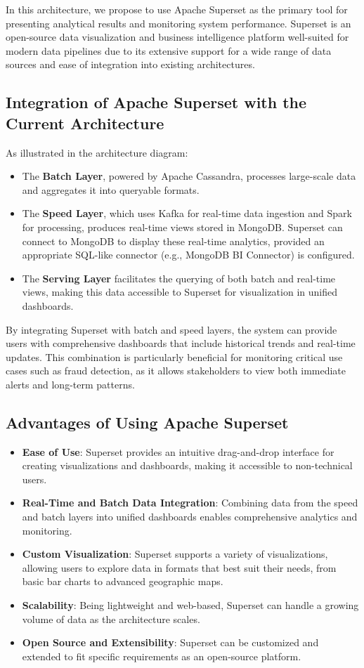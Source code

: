 \documentclass[12pt,a4paper, hidelinks]{article}
\begin{document}
In this architecture, we propose to use Apache Superset as the primary tool for presenting analytical results and monitoring system performance. Superset is an open-source data visualization and business intelligence platform well-suited for modern data pipelines due to its extensive support for a wide range of data sources and ease of integration into existing architectures.

\subsection{Integration of Apache Superset with the Current Architecture}
As illustrated in the architecture diagram:
\begin{itemize}
    \item The \textbf{Batch Layer}, powered by Apache Cassandra, processes large-scale data and aggregates it into queryable formats.
    \item The \textbf{Speed Layer}, which uses Kafka for real-time data ingestion and Spark for processing, produces real-time views stored in MongoDB. Superset can connect to MongoDB to display these real-time analytics, provided an appropriate SQL-like connector (e.g., MongoDB BI Connector) is configured.
    \item The \textbf{Serving Layer} facilitates the querying of both batch and real-time views, making this data accessible to Superset for visualization in unified dashboards.
\end{itemize}

By integrating Superset with batch and speed layers, the system can provide users with comprehensive dashboards that include historical trends and real-time updates. This combination is particularly beneficial for monitoring critical use cases such as fraud detection, as it allows stakeholders to view both immediate alerts and long-term patterns.

\subsection{Advantages of Using Apache Superset}
\begin{itemize}
    \item \textbf{Ease of Use}: Superset provides an intuitive drag-and-drop interface for creating visualizations and dashboards, making it accessible to non-technical users.
    \item \textbf{Real-Time and Batch Data Integration}: Combining data from the speed and batch layers into unified dashboards enables comprehensive analytics and monitoring.
    \item \textbf{Custom Visualization}: Superset supports a variety of visualizations, allowing users to explore data in formats that best suit their needs, from basic bar charts to advanced geographic maps.
    \item \textbf{Scalability}: Being lightweight and web-based, Superset can handle a growing volume of data as the architecture scales.
    \item \textbf{Open Source and Extensibility}: Superset can be customized and extended to fit specific requirements as an open-source platform.
\end{itemize}
\end{document}
